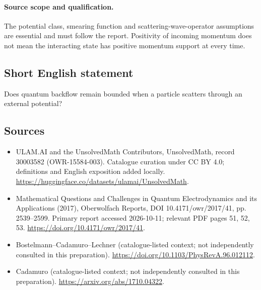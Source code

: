 \documentclass[11pt]{article}
\begin{document}
\paragraph{Source scope and qualification.}
The potential class, smearing function and scattering-wave-operator assumptions are essential and must follow the report. Positivity of incoming momentum does not mean the interacting state has positive momentum support at every time.
\subsection{Short English statement}
Does quantum backflow remain bounded when a particle scatters through an external potential?
\subsection{Sources}
\begin{itemize}
\item[\hypertarget{source:30003582:1}{S1}] ULAM.AI and the UnsolvedMath Contributors, UnsolvedMath, record 30003582 (OWR-15584-003). Catalogue curation under CC BY 4.0; definitions and English exposition added locally.
\url{https://huggingface.co/datasets/ulamai/UnsolvedMath}.
\item[\hypertarget{source:30003582:2}{S2}] Mathematical Questions and Challenges in Quantum Electrodynamics and its Applications (2017), Oberwolfach Reports, DOI 10.4171/owr/2017/41, pp. 2539--2599. Primary report accessed 2026-10-11; relevant PDF pages 51, 52, 53.
\url{https://doi.org/10.4171/owr/2017/41}.
\item[\hypertarget{source:30003582:3}{S3}] Bostelmann--Cadamuro--Lechner (catalogue-listed context; not independently consulted in this preparation).
\url{https://doi.org/10.1103/PhysRevA.96.012112}.
\item[\hypertarget{source:30003582:4}{S4}] Cadamuro (catalogue-listed context; not independently consulted in this preparation).
\url{https://arxiv.org/abs/1710.04322}.
\end{itemize}
\label{end:30003582}
\end{document}
